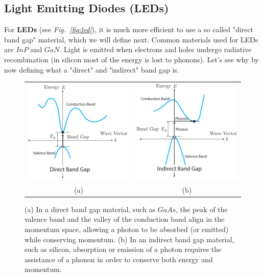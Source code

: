 \subsection{Light Emitting Diodes (LEDs)}
For \textbf{LEDs} (see \emph{Fig.~\ref{fig:led}}), it is much more efficient to use a so called "direct band gap" material, which we will define next.  Common materials used for LEDs are $InP$ and $GaN$.  Light is emitted when electrons and holes undergo radiative recombination (in silicon most of the energy is lost to phonons).  Let's see why by now defining what a "direct" and "indirect" band gap is.
\newpage
\begin{figure}[t]
\centering
\begin{tabular}{cc}
\includegraphics[width=.45\columnwidth]{bandgap_direct} & 
\includegraphics[width=.45\columnwidth]{bandgap_indirect}\\
(a) & (b)\\
\end{tabular}
\caption{(a) In a direct band gap material, such as $GaAs$, the peak of the valence band and the valley of the conduction band align in the momentum space, allowing a photon to be absorbed (or emitted) while conserving momentum.  (b) In an indirect band gap material, such as silicon, absorption or emission of a photon requires the assistance of a phonon in order to conserve both energy and momentum.}
\label{fig:band gap_direct}
\end{figure}
